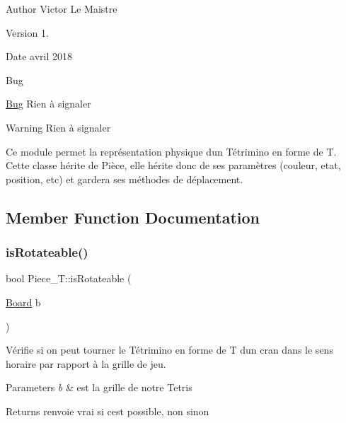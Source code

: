 \begin{DoxyAuthor}{Author}
Victor Le Maistre 
\end{DoxyAuthor}
\begin{DoxyVersion}{Version}
1. 
\end{DoxyVersion}
\begin{DoxyDate}{Date}
avril 2018 
\end{DoxyDate}
\begin{DoxyRefDesc}{Bug}
\item[\hyperlink{bug__bug000014}{Bug}]Rien à signaler \end{DoxyRefDesc}
\begin{DoxyWarning}{Warning}
Rien à signaler
\end{DoxyWarning}
Ce module permet la représentation physique d\textquotesingle{}un Tétrimino en forme de T. Cette classe hérite de Pièce, elle hérite donc de ses paramètres (couleur, etat, position, etc) et gardera ses méthodes de déplacement. 

\subsection{Member Function Documentation}
\mbox{\label{classPiece__T_a64088f0140b870d178169e36460cd4de}} 
\subsubsection{\texorpdfstring{is\+Rotateable()}{isRotateable()}}
{\footnotesize\ttfamily bool Piece\+\_\+\+T\+::is\+Rotateable (\begin{DoxyParamCaption}\item[{\hyperlink{classBoard}{Board}}]{b }\end{DoxyParamCaption})\hspace{0.3cm}{\ttfamily [virtual]}}



Vérifie si on peut tourner le Tétrimino en forme de T d\textquotesingle{}un cran dans le sens horaire par rapport à la grille de jeu. 


\begin{DoxyParams}{Parameters}
{\em b} & est la grille de notre Tetris \\
\hline
\end{DoxyParams}
\begin{DoxyReturn}{Returns}
renvoie vrai si c\textquotesingle{}est possible, non sinon 
\end{DoxyReturn}


